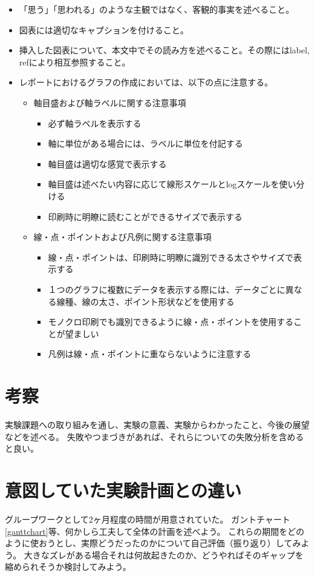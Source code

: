 \documentclass[a4paper, 11pt, titlepage]{jsarticle}
\begin{document}
\begin{itemize}
 \item 「思う」「思われる」のような主観ではなく、客観的事実を述べること。
 \item 図表には適切なキャプションを付けること。
 \item 挿入した図表について、本文中でその読み方を述べること。その際にはlabel, refにより相互参照すること。
 \item レポートにおけるグラフの作成においては、以下の点に注意する。
 \begin{itemize}
 	\item 軸目盛および軸ラベルに関する注意事項
 	\begin{itemize}
 		\item 必ず軸ラベルを表示する
 		\item 軸に単位がある場合には、ラベルに単位を付記する
 		\item 軸目盛は適切な感覚で表示する
 		\item 軸目盛は述べたい内容に応じて線形スケールとlogスケールを使い分ける
 		\item 印刷時に明瞭に読むことができるサイズで表示する
 	\end{itemize}
 	\item 線・点・ポイントおよび凡例に関する注意事項
 	\begin{itemize}
 		\item 線・点・ポイントは、印刷時に明瞭に識別できる太さやサイズで表示する
 		\item １つのグラフに複数にデータを表示する際には、データごとに異なる線種、線の太さ、ポイント形状などを使用する
 		\item モノクロ印刷でも識別できるように線・点・ポイントを使用することが望ましい
 		\item 凡例は線・点・ポイントに重ならないように注意する
 	\end{itemize}
 \end{itemize}
\end{itemize}

\section{考察}
実験課題への取り組みを通し、実験の意義、実験からわかったこと、今後の展望などを述べる。
失敗やつまづきがあれば、それらについての失敗分析を含めると良い。

\section{意図していた実験計画との違い}
グループワークとして2ヶ月程度の時間が用意されていた。
ガントチャート\ref{ganttchart}等、何かしら工夫して全体の計画を述べよう。
これらの期間をどのように使おうとし、実際どうだったのかについて自己評価（振り返り）してみよう。
大きなズレがある場合それは何故起きたのか、どうやればそのギャップを縮められそうか検討してみよう。
\end{document}
